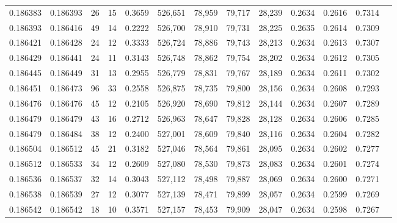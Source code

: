 \begin{tabular}{rrrrrrrrrrrrr}
0.186383 & 0.186393 &    26 &  15 &                                     0.3659 & 526,651 &  78,959 &  79,717 &  28,239 & 0.2634 & 0.2616 & 0.7314 \\
0.186393 & 0.186416 &    49 &  14 &                                     0.2222 & 526,700 &  78,910 &  79,731 &  28,225 & 0.2635 & 0.2614 & 0.7309 \\
0.186421 & 0.186428 &    24 &  12 &                                     0.3333 & 526,724 &  78,886 &  79,743 &  28,213 & 0.2634 & 0.2613 & 0.7307 \\
0.186429 & 0.186441 &    24 &  11 &                                     0.3143 & 526,748 &  78,862 &  79,754 &  28,202 & 0.2634 & 0.2612 & 0.7305 \\
0.186445 & 0.186449 &    31 &  13 &                                     0.2955 & 526,779 &  78,831 &  79,767 &  28,189 & 0.2634 & 0.2611 & 0.7302 \\
0.186451 & 0.186473 &    96 &  33 &                                     0.2558 & 526,875 &  78,735 &  79,800 &  28,156 & 0.2634 & 0.2608 & 0.7293 \\
0.186476 & 0.186476 &    45 &  12 &                                     0.2105 & 526,920 &  78,690 &  79,812 &  28,144 & 0.2634 & 0.2607 & 0.7289 \\
0.186479 & 0.186479 &    43 &  16 &                                     0.2712 & 526,963 &  78,647 &  79,828 &  28,128 & 0.2634 & 0.2606 & 0.7285 \\
0.186479 & 0.186484 &    38 &  12 &                                     0.2400 & 527,001 &  78,609 &  79,840 &  28,116 & 0.2634 & 0.2604 & 0.7282 \\
0.186504 & 0.186512 &    45 &  21 &                                     0.3182 & 527,046 &  78,564 &  79,861 &  28,095 & 0.2634 & 0.2602 & 0.7277 \\
0.186512 & 0.186533 &    34 &  12 &                                     0.2609 & 527,080 &  78,530 &  79,873 &  28,083 & 0.2634 & 0.2601 & 0.7274 \\
0.186536 & 0.186537 &    32 &  14 &                                     0.3043 & 527,112 &  78,498 &  79,887 &  28,069 & 0.2634 & 0.2600 & 0.7271 \\
0.186538 & 0.186539 &    27 &  12 &                                     0.3077 & 527,139 &  78,471 &  79,899 &  28,057 & 0.2634 & 0.2599 & 0.7269 \\
0.186542 & 0.186542 &    18 &  10 &                                     0.3571 & 527,157 &  78,453 &  79,909 &  28,047 & 0.2634 & 0.2598 & 0.7267 \\

\end{tabular}

